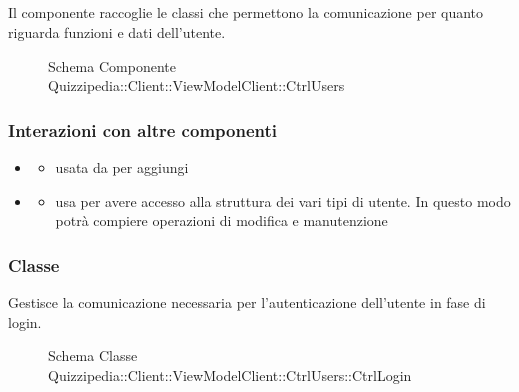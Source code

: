\subsection{}
Il componente raccoglie le classi che permettono la comunicazione per quanto riguarda funzioni e dati dell'utente.
\begin{figure}[H]
\centering
\noindent{}
\caption[Schema Componente Quizzipedia::Client::ViewModelClient::CtrlUsers]{Schema Componente Quizzipedia::Client::ViewModelClient::CtrlUsers}
\end{figure}
\subsubsection{Interazioni con altre componenti}
\begin{itemize}
\item {}
\begin{itemize}
\item usata da  per aggiungi
\end{itemize}
\item {}
\begin{itemize}
\item usa  per avere accesso alla struttura dei vari tipi di utente. In questo modo potrà compiere operazioni di modifica e manutenzione
\end{itemize}
\end{itemize}
\subsubsection{Classe }
Gestisce la comunicazione necessaria per l'autenticazione dell'utente in fase di login.
\begin{figure}[H]
\centering
\noindent{}
\caption[Schema Classe CtrlLogin]{Schema Classe Quizzipedia::Client::ViewModelClient::CtrlUsers::CtrlLogin}
\end{figure}
